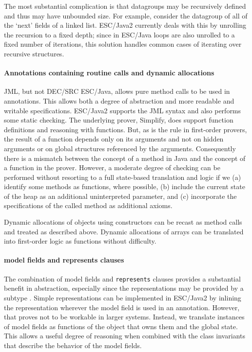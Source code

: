 \documentclass{sig-alternate}
\begin{document}
The most substantial complication is that datagroups may be recursively defined and
thus may have unbounded size.  For example, consider the datagroup of all of the `next' fields of a 
linked list.  ESC/Java2 currently deals with this by unrolling the recursion to a fixed
depth; since in ESC/Java loops are also unrolled to a fixed number of iterations, this solution
handles common cases of iterating over recursive structures.

\paragraph*{Annotations containing routine calls and dynamic allocations}
JML, but not DEC/SRC ESC/Java, allows pure method calls to be used in annotations.  This allows both a degree of 
abstraction and more readable and writable specifications. 
ESC/Java2 supports the JML syntax and also performs some static checking.
The underlying prover, Simplify, does support function definitions and reasoning with
functions.  But, as is the rule in first-order provers, the result of a function depends
only on its arguments and not on hidden arguments or on global structures referenced by
the arguments.  Consequently there is a mismatch between the concept of a method in Java
and the concept of a function in the prover.  
However, a moderate degree of checking can be performed without
resorting to a full state-based translation and logic if we (a) identify some methods
as functions, where possible, (b) include the current state of the
heap as an additional uninterpreted parameter, and (c) incorporate the specifications of the called
method as additional axioms.  

Dynamic allocations of objects using constructors can be recast as method calls and treated as described above.
Dynamic allocations of arrays can be translated into first-order logic as functions without difficulty.


\paragraph*{model fields and represents clauses}
The combination of model fields and \texttt{represents} clauses
provides a substantial benefit in abstraction, especially since the
representations may be provided by a subtype \cite{Cheon-etal03}.  Simple representations
can be implemented in ESC/Java2 by inlining the representation wherever
the model field is used in an annotation.  However, that proves not to be workable
in larger systems.  Instead, we translate instances of model fields as functions of
the object that owns them and the global state.  This allows a useful
degree of reasoning when combined with the class invariants
that describe the behavior of the model fields.
\end{document}

